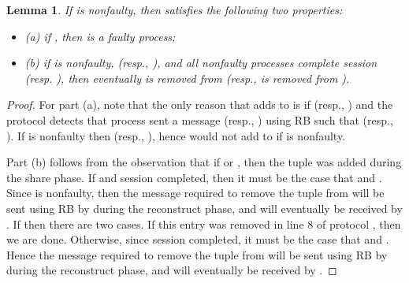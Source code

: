 \documentclass{sig-alternate}
\newtheorem{lemma}{Lemma}
\def\beginsmall#1{\vspace{-\parskip}\begin{#1}\itemsep-\parskip}
\def\endsmall#1{\end{#1}\vspace{-\parskip}}
\newcommand{\DMM}{\text{DMM}\xspace}
\begin{document}
\begin{lemma}\label{lem:DMM}
If  is nonfaulty, then  satisfies the following
two properties:
\beginsmall{itemize}
\item[(a)]  if , then  is a faulty process;
\item[(b)] if  is nonfaulty,
 (resp., ),
and all 
nonfaulty
processes complete session  (resp. ), then
eventually
 is removed from  (resp.,  is removed
from ).
\endsmall{itemize}
\end{lemma}


\begin{proof}
For part (a), note that
the only reason that  adds  to  is if 
(resp., ) and the \DMM protocol detects that
process  sent a message 
(resp., )
using RB
such that 
(resp., ). If  is nonfaulty then 
(resp., ),
hence  would not add  to  if  is nonfaulty.

Part (b) follows from the observation that if  or , then the tuple was added during
the share phase.
If  and session  completed, then it must
be the case that  and . Since  is nonfaulty, then the message required to
remove the tuple from  will be sent 
using RB by  during the reconstruct phase, and will eventually be
received by . 
If  then there are two cases. If this entry was
removed in line 8 of protocol , then we are
done. Otherwise, since session  completed, it must be the
case that  and . Hence the message
required to remove the tuple from  will be sent using RB by 
during the reconstruct phase, and will eventually be received by . 
\end{proof}
\end{document}
